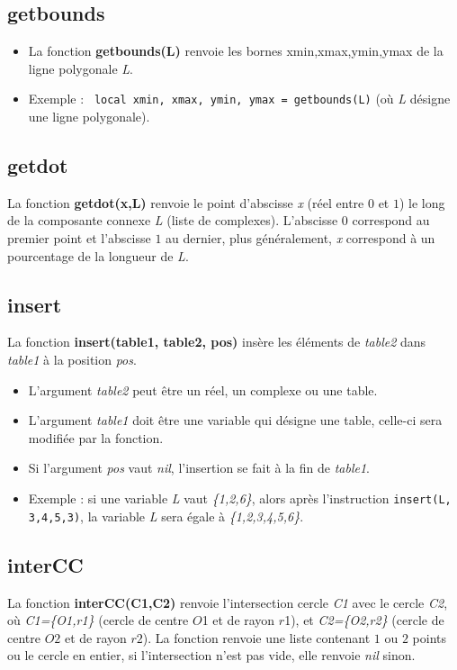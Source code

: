 \subsection{getbounds}
\begin{itemize}
    \item La fonction \textbf{getbounds(L)} renvoie les bornes xmin,xmax,ymin,ymax de la ligne polygonale \emph{L}.
    \item Exemple : \texttt{ local xmin, xmax, ymin, ymax = getbounds(L)} (où \emph{L} désigne une ligne polygonale).
\end{itemize}

\subsection{getdot}
La fonction \textbf{getdot(x,L)} renvoie le point d'abscisse \emph{x} (réel entre $0$ et $1$) le long de la composante connexe \emph{L} (liste de complexes). L'abscisse $0$ correspond au premier point et l'abscisse $1$ au dernier, plus généralement, \emph{x} correspond à un pourcentage de la longueur de \emph{L}.

\subsection{insert}
La fonction \textbf{insert(table1, table2, pos)} insère les éléments de \emph{table2} dans \emph{table1} à la position \emph{pos}.

\begin{itemize}
    \item L'argument \emph{table2} peut être un réel, un complexe ou une table.
    \item L'argument \emph{table1} doit être une variable qui désigne une table, celle-ci sera modifiée par la fonction.
    \item Si l'argument \emph{pos} vaut \emph{nil}, l'insertion se fait à la fin de \emph{table1}.
    \item Exemple : si une variable \emph{L} vaut \emph{\{1,2,6\}}, alors après l'instruction \texttt{insert(L, {3,4,5},3)}, la variable \emph{L} sera égale à \emph{\{1,2,3,4,5,6\}}.
\end{itemize}

\subsection{interCC}
La fonction \textbf{interCC(C1,C2)} renvoie l'intersection cercle \emph{C1} avec le cercle \emph{C2}, où \emph{C1=\{O1,r1\}} (cercle de centre $O$1 et de rayon $r$1), et \emph{C2=\{O2,r2\}} (cercle de centre $O2$ et de rayon $r2$). La fonction renvoie une liste contenant $1$ ou $2$ points ou le cercle en entier,  si l'intersection n'est pas vide, elle renvoie \emph{nil} sinon.

